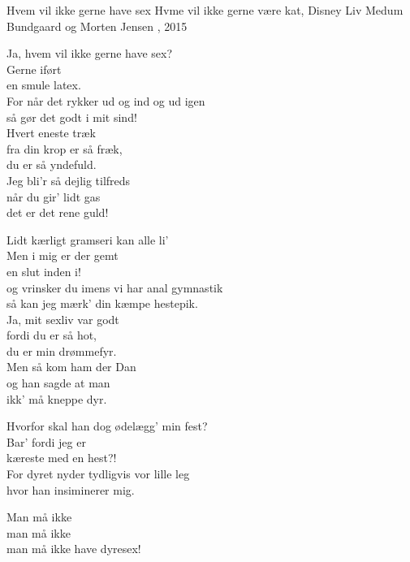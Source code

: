 \begin{song}{Hvem vil ikke gerne have sex}
  {} %
  {Hvme vil ikke gerne være kat, Disney} %
  {Liv Medum Bundgaard og Morten Jensen} %
  {\TKET{}, 2015} %
  {\NotCCLIed} %

  \begin{SBVerse}
    Ja, hvem vil ikke gerne have sex?\\
    Gerne iført\\
    en smule latex.\\
    For når det rykker ud og ind og ud igen\\
    så gør det godt i mit sind!\\
    Hvert eneste træk\\
    fra din krop er så fræk,\\
    du er så yndefuld.\\
    Jeg bli’r så dejlig tilfreds\\
    når du gir’ lidt gas\\
    det er det rene guld!
  \end{SBVerse}

  \begin{SBVerse}
    Lidt kærligt gramseri kan alle li’\\
    Men i mig er der gemt\\
    en slut inden i!\\
    og vrinsker du imens vi har anal gymnastik\\
    så kan jeg mærk’ din kæmpe hestepik.\\
    Ja, mit sexliv var godt\\
    fordi du er så hot,\\
    du er min drømmefyr.\\
    Men så kom ham der Dan\\
    og han sagde at man\\
    ikk’ må kneppe dyr.
  \end{SBVerse}

  \begin{SBSection*}
    Hvorfor skal han dog ødelægg’ min fest?\\
    Bar’ fordi jeg er\\
    kæreste med en hest?!\\
    For dyret nyder tydligvis vor lille leg\\
    hvor han insiminerer mig.
  \end{SBSection*}

  \begin{SBChorus}
    Man må ikke\\
    man må ikke\\
    man må ikke have dyresex!
  \end{SBChorus}
\end{song}


